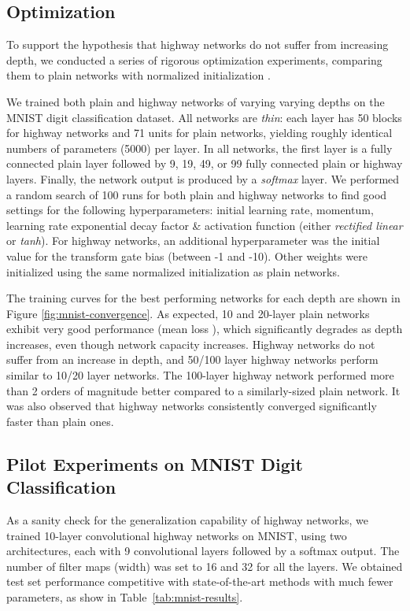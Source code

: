 \documentclass{article}
\begin{document}
\subsection{Optimization}\label{sec:opti}
To support the hypothesis that highway networks do not suffer from increasing depth, we conducted a series of rigorous optimization experiments, comparing them to plain networks with normalized initialization \cite{Glorot2010,He2015}.

We trained both plain and highway networks of varying varying depths on the MNIST digit classification dataset. 
All networks are \emph{thin}: each layer has 50 blocks for highway networks and 71 units for plain networks, yielding roughly identical numbers of parameters (5000) per layer.
In all networks, the first layer is a fully connected plain layer followed by 9, 19, 49, or 99 fully connected plain or highway layers. Finally, the network output is produced by a \emph{softmax} layer. 
We performed a random search of 100 runs for both plain and highway networks to find good settings for the following hyperparameters: initial learning rate, momentum, learning rate exponential decay factor \& activation function (either \textit{rectified linear} or \textit{tanh}). For highway networks, an additional hyperparameter was the initial value for the transform gate bias (between -1 and -10). Other weights were initialized using the same normalized initialization as plain networks.

The training curves for the best performing networks for each depth are shown in Figure \ref{fig:mnist-convergence}. As expected, 10 and 20-layer plain networks exhibit very good performance (mean loss ), which significantly degrades as depth increases, even though network capacity increases.
Highway networks do not suffer from an increase in depth, and 50/100 layer highway networks perform similar to 10/20 layer networks. The 100-layer highway network performed more than 2 orders of magnitude better compared to a similarly-sized plain network.
It was also observed that highway networks consistently converged significantly faster than plain ones.


\subsection{Pilot Experiments on MNIST Digit Classification}
As a sanity check for the generalization capability of highway networks, we trained 10-layer convolutional highway networks on MNIST, using two architectures, each with 9 convolutional layers followed by a softmax output. The number of filter maps (width) was set to 16 and 32 for all the layers. We obtained test set performance competitive with state-of-the-art methods with much fewer parameters, as show in Table~\ref{tab:mnist-results}.
\end{document}
